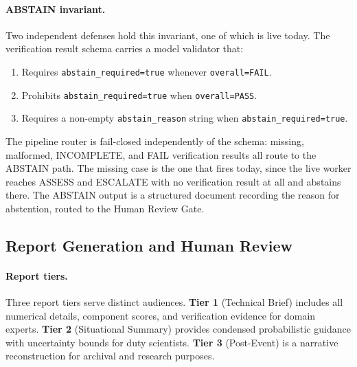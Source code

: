 \documentclass{article}
\begin{document}
\paragraph{ABSTAIN invariant.}
Two independent defenses hold this invariant, one of which is live
today. The verification result schema carries a model validator
that:
\begin{enumerate}
  \item Requires \texttt{abstain\_required=true} whenever
    \texttt{overall=FAIL}.
  \item Prohibits \texttt{abstain\_required=true} when
    \texttt{overall=PASS}.
  \item Requires a non-empty \texttt{abstain\_reason} string when
    \texttt{abstain\_required=true}.
\end{enumerate}
The pipeline router is fail-closed independently of the schema:
missing, malformed, INCOMPLETE, and FAIL verification results all
route to the ABSTAIN path.  The missing case is the one that fires today, since the
live worker reaches ASSESS and ESCALATE with no verification result at
all and abstains there. The ABSTAIN output is a structured document recording the reason
for abstention, routed to the Human Review Gate.

\subsection{Report Generation and Human Review}
\label{sec:report}

\paragraph{Report tiers.}
Three report tiers serve distinct audiences. \textbf{Tier 1} (Technical
Brief) includes all numerical details, component scores, and
verification evidence for domain experts. \textbf{Tier 2} (Situational
Summary) provides condensed probabilistic guidance with uncertainty
bounds for duty scientists. \textbf{Tier 3} (Post-Event) is a
narrative reconstruction for archival and research purposes.
\end{document}
